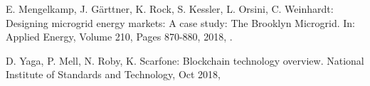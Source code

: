 \documentclass[runningheads]{llncs}
\begin{document}
\begin{thebibliography}{8}
E. Mengelkamp, J. Gärttner, K. Rock, S. Kessler, L. Orsini, C. Weinhardt: Designing microgrid energy markets: A case study: The Brooklyn Microgrid. In: Applied Energy, Volume 210, Pages 870-880, 2018, .

D. Yaga, P. Mell, N. Roby, K. Scarfone: Blockchain technology overview. National Institute of Standards and Technology, Oct 2018, 

\end{thebibliography}
\end{document}
